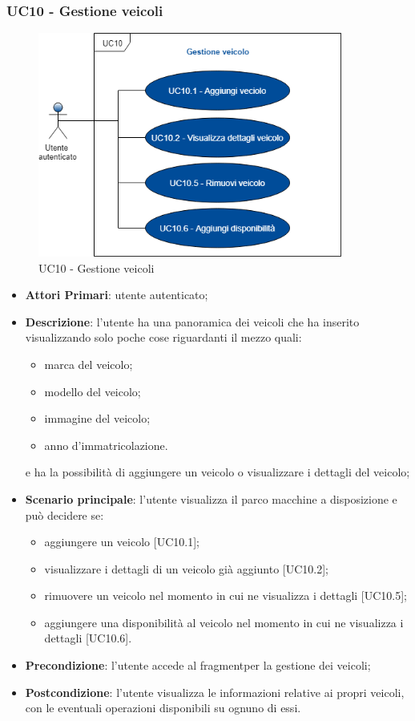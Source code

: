 \subsubsection{UC10 - Gestione veicoli}
  \begin{figure}[H]
 	\includegraphics[width=10cm]{res/images/UC10Gestioneveicolo.png}
 	\centering
 	\caption{UC10 - Gestione veicoli}
 \end{figure}
 \begin{itemize}
 	\item \textbf{Attori Primari}: utente autenticato;
 	\item \textbf{Descrizione}: l'utente ha una panoramica dei veicoli che ha inserito visualizzando solo poche cose riguardanti il mezzo quali:
 	\begin{itemize}
 		\item marca del veicolo;
 		\item modello del veicolo;
 		\item immagine del veicolo;
 		\item anno d'immatricolazione.
 	\end{itemize} 
 	e ha la possibilità di aggiungere un veicolo o visualizzare i dettagli del veicolo;
 	\item \textbf{Scenario principale}: l'utente visualizza il parco macchine a disposizione e può decidere se:
 	\begin{itemize}
 		\item aggiungere un veicolo [UC10.1];
 		\item visualizzare i dettagli di un veicolo già aggiunto [UC10.2];
 		\item rimuovere un veicolo nel momento in cui ne visualizza i dettagli [UC10.5];
 		\item aggiungere una disponibilità al veicolo nel momento in cui ne visualizza i dettagli [UC10.6].
 	\end{itemize}
 	\item \textbf{Precondizione}: l'utente accede al fragment\glosp per la gestione dei veicoli;
 	\item \textbf{Postcondizione}: l'utente visualizza le informazioni relative ai propri veicoli, con le eventuali operazioni disponibili su ognuno di essi.
 \end{itemize}
